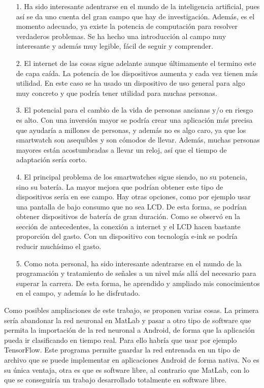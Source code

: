 \documentclass[12pt]{article}
\numberwithin{equation}{section}
\begin{document}
\begin{enumerate}
\item[1.] Ha sido interesante adentrarse en el mundo de la inteligencia artificial, pues así se da uno cuenta del gran campo que hay de investigación. Además, es el momento adecuado, ya existe la potencia de computación para resolver verdaderos problemas. Se ha hecho una introducción al campo muy interesante y además muy legible, fácil de seguir y comprender.

\item[2.] El internet de las cosas sigue adelante aunque últimamente el termino este de capa caída. La potencia de los dispositivos aumenta y cada vez tienen más utilidad. En este caso se ha usado un dispositivo de uso general para algo muy concreto y que podría tener utilidad para muchas personas.

\item[3.] El potencial para el cambio de la vida de personas ancianas y/o en riesgo es alto. Con una inversión mayor se podría crear una aplicación más precisa que ayudaría a millones de personas, y además no es algo caro, ya que los smartwatch son asequibles y son cómodos de llevar. Además, muchas personas mayores están acostumbradas a llevar un reloj, así que el tiempo de adaptación sería corto.

\item[4.] El principal problema de los smartwatches sigue siendo, no su potencia, sino su batería. La mayor mejora que podrían obtener este tipo de dispositivos sería en ese campo. Hay otras opciones, como por ejemplo usar una pantalla de bajo consumo que no sea LCD. De esta forma, se podrían obtener dispositivos de batería de gran duración. Como se observó en la sección de antecedentes, la conexión a internet y el LCD hacen bastante proporción del gasto. Con un dispositivo con tecnología e-ink se podría reducir muchísimo el gasto.

\item[5.] Como nota personal, ha sido interesante adentrarse en el mundo de la programación y tratamiento de señales a un nivel más allá del necesario para superar la carrera. De esta forma, he aprendido y ampliado mis conocimientos en el campo, y además lo he disfrutado.
\end{enumerate}

Como posibles ampliaciones de este trabajo, se proponen varias cosas. La primera sería abandonar la red neuronal en MatLab y pasar a otro tipo de software que permita la importación de la red neuronal a Android, de forma que la aplicación pueda ir clasificando en tiempo real. Para ello habría que usar por ejemplo TensorFlow. Este programa permite guardar la red entrenada en un tipo de archivo que se puede implementar en aplicaciones Android de forma nativa. No es su única ventaja, otra es que es software libre, al contrario que MatLab, con lo que se conseguiría un trabajo desarrollado totalmente en software libre.
\end{document}
